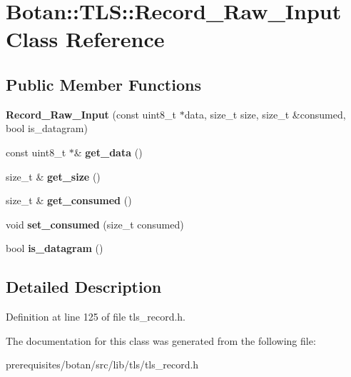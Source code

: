 \hypertarget{class_botan_1_1_t_l_s_1_1_record___raw___input}{}\section{Botan\+:\+:T\+LS\+:\+:Record\+\_\+\+Raw\+\_\+\+Input Class Reference}
\label{class_botan_1_1_t_l_s_1_1_record___raw___input}
\subsection*{Public Member Functions}
\begin{DoxyCompactItemize}
\item 
\mbox{\label{class_botan_1_1_t_l_s_1_1_record___raw___input_af0ee39d79a915c80de1dd500fff6c596}} 
{\bfseries Record\+\_\+\+Raw\+\_\+\+Input} (const uint8\+\_\+t $\ast$data, size\+\_\+t size, size\+\_\+t \&consumed, bool is\+\_\+datagram)
\item 
\mbox{\label{class_botan_1_1_t_l_s_1_1_record___raw___input_a06262817c3c5de7d912062271d24f668}} 
const uint8\+\_\+t $\ast$\& {\bfseries get\+\_\+data} ()
\item 
\mbox{\label{class_botan_1_1_t_l_s_1_1_record___raw___input_a3814b970680f2a59f7336ab906471399}} 
size\+\_\+t \& {\bfseries get\+\_\+size} ()
\item 
\mbox{\label{class_botan_1_1_t_l_s_1_1_record___raw___input_a858dbaeb8e2fc94ceb56c4842ec87885}} 
size\+\_\+t \& {\bfseries get\+\_\+consumed} ()
\item 
\mbox{\label{class_botan_1_1_t_l_s_1_1_record___raw___input_a4d8a8bb66c98fab87443f72210a70949}} 
void {\bfseries set\+\_\+consumed} (size\+\_\+t consumed)
\item 
\mbox{\label{class_botan_1_1_t_l_s_1_1_record___raw___input_a68081d4781b38695025abfddcc3e373e}} 
bool {\bfseries is\+\_\+datagram} ()
\end{DoxyCompactItemize}


\subsection{Detailed Description}


Definition at line 125 of file tls\+\_\+record.\+h.



The documentation for this class was generated from the following file\+:\begin{DoxyCompactItemize}
\item 
prerequisites/botan/src/lib/tls/tls\+\_\+record.\+h\end{DoxyCompactItemize}
